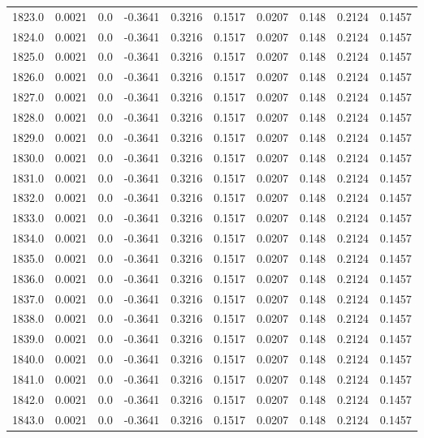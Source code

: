 \begin{longtable}{lrrrrrrrrr}
1823.0 & 0.0021 & 0.0 & -0.3641 & 0.3216 & 0.1517 & 0.0207 & 0.148 & 0.2124 & 0.1457 \\
1824.0 & 0.0021 & 0.0 & -0.3641 & 0.3216 & 0.1517 & 0.0207 & 0.148 & 0.2124 & 0.1457 \\
1825.0 & 0.0021 & 0.0 & -0.3641 & 0.3216 & 0.1517 & 0.0207 & 0.148 & 0.2124 & 0.1457 \\
1826.0 & 0.0021 & 0.0 & -0.3641 & 0.3216 & 0.1517 & 0.0207 & 0.148 & 0.2124 & 0.1457 \\
1827.0 & 0.0021 & 0.0 & -0.3641 & 0.3216 & 0.1517 & 0.0207 & 0.148 & 0.2124 & 0.1457 \\
1828.0 & 0.0021 & 0.0 & -0.3641 & 0.3216 & 0.1517 & 0.0207 & 0.148 & 0.2124 & 0.1457 \\
1829.0 & 0.0021 & 0.0 & -0.3641 & 0.3216 & 0.1517 & 0.0207 & 0.148 & 0.2124 & 0.1457 \\
1830.0 & 0.0021 & 0.0 & -0.3641 & 0.3216 & 0.1517 & 0.0207 & 0.148 & 0.2124 & 0.1457 \\
1831.0 & 0.0021 & 0.0 & -0.3641 & 0.3216 & 0.1517 & 0.0207 & 0.148 & 0.2124 & 0.1457 \\
1832.0 & 0.0021 & 0.0 & -0.3641 & 0.3216 & 0.1517 & 0.0207 & 0.148 & 0.2124 & 0.1457 \\
1833.0 & 0.0021 & 0.0 & -0.3641 & 0.3216 & 0.1517 & 0.0207 & 0.148 & 0.2124 & 0.1457 \\
1834.0 & 0.0021 & 0.0 & -0.3641 & 0.3216 & 0.1517 & 0.0207 & 0.148 & 0.2124 & 0.1457 \\
1835.0 & 0.0021 & 0.0 & -0.3641 & 0.3216 & 0.1517 & 0.0207 & 0.148 & 0.2124 & 0.1457 \\
1836.0 & 0.0021 & 0.0 & -0.3641 & 0.3216 & 0.1517 & 0.0207 & 0.148 & 0.2124 & 0.1457 \\
1837.0 & 0.0021 & 0.0 & -0.3641 & 0.3216 & 0.1517 & 0.0207 & 0.148 & 0.2124 & 0.1457 \\
1838.0 & 0.0021 & 0.0 & -0.3641 & 0.3216 & 0.1517 & 0.0207 & 0.148 & 0.2124 & 0.1457 \\
1839.0 & 0.0021 & 0.0 & -0.3641 & 0.3216 & 0.1517 & 0.0207 & 0.148 & 0.2124 & 0.1457 \\
1840.0 & 0.0021 & 0.0 & -0.3641 & 0.3216 & 0.1517 & 0.0207 & 0.148 & 0.2124 & 0.1457 \\
1841.0 & 0.0021 & 0.0 & -0.3641 & 0.3216 & 0.1517 & 0.0207 & 0.148 & 0.2124 & 0.1457 \\
1842.0 & 0.0021 & 0.0 & -0.3641 & 0.3216 & 0.1517 & 0.0207 & 0.148 & 0.2124 & 0.1457 \\
1843.0 & 0.0021 & 0.0 & -0.3641 & 0.3216 & 0.1517 & 0.0207 & 0.148 & 0.2124 & 0.1457 \\

\end{longtable}
